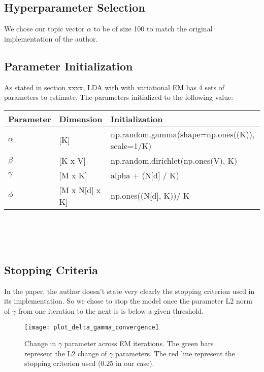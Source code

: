 \documentclass[11pt]{article}
\begin{document}
\subsection{Hyperparameter Selection}
We chose our topic vector $\alpha$ to be of size 100 to match the original implementation of the author. 

\subsection{Parameter   Initialization}
As stated in section xxxx, LDA with with variational EM has 4 sets of parameters to estimate. The parameters initialized to the following value:

\begin{tabular}{ |p{2cm}||p{3cm}|p{10cm}| }
 \hline
 Parameter & Dimension  & Initialization\\
 \hline
  $\alpha$& [K]   & np.random.gamma(shape=np.ones((K)), scale=1/K)\\
  $\beta$  & [K x V]  &  np.random.dirichlet(np.ones(V), K)\\
  $\gamma $  & [M x K]  &  alpha + (N[d] / K)  \\
  $\phi$  & [M x N[d] x K]  &   np.ones((N[d], K))/ K \\
  \hline
\end{tabular}\\
\\
\\
\subsection{Stopping Criteria }
In the paper, the author doesn't state very clearly the stopping criterion used in its implementation. So we chose to stop the model once the parameter L2 norm of $\gamma$   from one iteration to the next is is below a given threshold. 
\\

\begin{figure}[ht]
\vskip 0.2in
\begin{center}
\centerline{\texttt{[image: plot\_delta\_gamma\_convergence]}}
\caption{Change in $\gamma$ parameter across EM iterations. The green bars represent the L2 change of  $\gamma$ parameters. The red line represent the stopping criterion  used (0.25 in our case).}
\label{icml-historical}
\end{center}
\vskip -0.2in
\end{figure}
\end{document}
